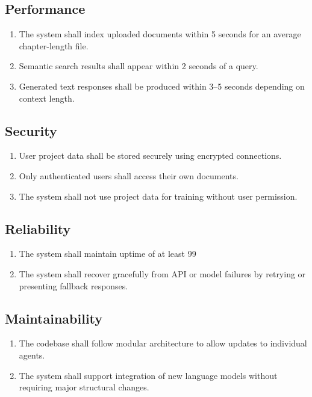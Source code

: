 \subsection{Performance}
\begin{enumerate}
    \item The system shall index uploaded documents within 5 seconds for an average chapter-length file.
    \item Semantic search results shall appear within 2 seconds of a query.
    \item Generated text responses shall be produced within 3–5 seconds depending on context length.
\end{enumerate}

\subsection{Security}
\begin{enumerate}
    \item User project data shall be stored securely using encrypted connections.
    \item Only authenticated users shall access their own documents.
    \item The system shall not use project data for training without user permission.
\end{enumerate}

\subsection{Reliability}
\begin{enumerate}
    \item The system shall maintain uptime of at least 99%
    \item The system shall recover gracefully from API or model failures by retrying or presenting fallback responses.
\end{enumerate}

\subsection{Maintainability}
\begin{enumerate}
    \item The codebase shall follow modular architecture to allow updates to individual agents.
    \item The system shall support integration of new language models without requiring major structural changes.
\end{enumerate}

